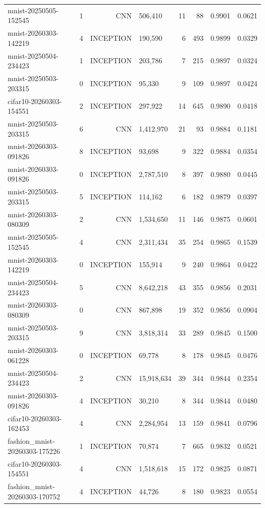 \begin{tabular}{llrlrrrr}
mnist-20250505-152545 & 1 & CNN & 506,410 & 11 & 88 & 0.9901 & 0.0621 \\
mnist-20260303-142219 & 4 & INCEPTION & 190,590 & 6 & 493 & 0.9899 & 0.0329 \\
mnist-20250504-234423 & 1 & INCEPTION & 203,786 & 7 & 215 & 0.9897 & 0.0324 \\
mnist-20250503-203315 & 0 & INCEPTION & 95,330 & 9 & 109 & 0.9897 & 0.0424 \\
cifar10-20260303-154551 & 2 & INCEPTION & 297,922 & 14 & 645 & 0.9890 & 0.0418 \\
mnist-20250503-203315 & 6 & CNN & 1,412,970 & 21 & 93 & 0.9884 & 0.1181 \\
mnist-20260303-091826 & 8 & INCEPTION & 93,698 & 9 & 322 & 0.9884 & 0.0354 \\
mnist-20260303-091826 & 0 & INCEPTION & 2,787,510 & 8 & 397 & 0.9880 & 0.0445 \\
mnist-20250503-203315 & 5 & INCEPTION & 114,162 & 6 & 182 & 0.9879 & 0.0397 \\
mnist-20260303-080309 & 2 & CNN & 1,534,650 & 11 & 146 & 0.9875 & 0.0601 \\
mnist-20250505-152545 & 4 & CNN & 2,311,434 & 35 & 254 & 0.9865 & 0.1539 \\
mnist-20260303-142219 & 0 & INCEPTION & 155,914 & 9 & 240 & 0.9864 & 0.0422 \\
mnist-20250504-234423 & 5 & CNN & 8,642,218 & 43 & 355 & 0.9856 & 0.2031 \\
mnist-20260303-080309 & 0 & CNN & 867,898 & 19 & 352 & 0.9856 & 0.0904 \\
mnist-20250503-203315 & 9 & CNN & 3,818,314 & 33 & 289 & 0.9845 & 0.1500 \\
mnist-20260303-061228 & 0 & INCEPTION & 69,778 & 8 & 178 & 0.9845 & 0.0476 \\
mnist-20250504-234423 & 2 & CNN & 15,918,634 & 39 & 344 & 0.9844 & 0.2354 \\
mnist-20260303-091826 & 4 & INCEPTION & 30,210 & 8 & 344 & 0.9844 & 0.0480 \\
cifar10-20260303-162453 & 4 & CNN & 2,284,954 & 13 & 159 & 0.9841 & 0.0796 \\
fashion_mnist-20260303-175226 & 1 & INCEPTION & 70,874 & 7 & 665 & 0.9832 & 0.0521 \\
cifar10-20260303-154551 & 4 & CNN & 1,518,618 & 15 & 172 & 0.9825 & 0.0871 \\
fashion_mnist-20260303-170752 & 4 & INCEPTION & 44,726 & 8 & 180 & 0.9823 & 0.0554 \\

\end{tabular}
